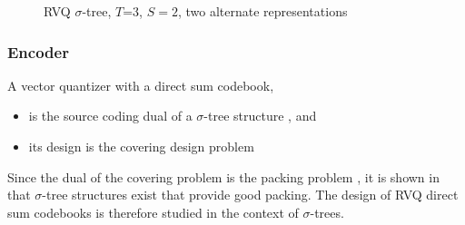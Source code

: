 \begin{figure}[ht]
	\centering	
	\caption{RVQ $\sigma$-tree, $T$=3, $S=2$, two alternate representations} 
	\label{fig:RVQ_sigma_tree}				
\end{figure}



\subsubsection{Encoder}
A vector quantizer with a direct sum codebook,

\begin{itemize}
\item is the source coding dual of a $\sigma$-tree structure \cite{1993_sigmaTrees_Barnes}, and
\item its design is the covering design problem
\end{itemize}

Since the dual of the covering problem is the packing problem \cite{BOOK_spheres_Conway}, it is shown in \cite{1993_sigmaTrees_Barnes} that $\sigma$-tree structures exist that provide good packing.  The design of RVQ direct sum codebooks is therefore studied in the context of $\sigma$-trees.

